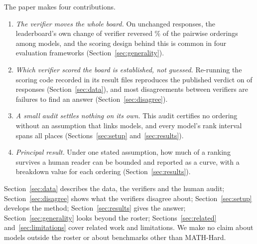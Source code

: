 The paper makes four contributions.
\begin{enumerate}
\item \emph{The verifier moves the whole board.} On unchanged responses, the leaderboard's own change
  of verifier reversed \BoardShiftDiscordantPct\% of the pairwise orderings among
  \BoardShiftModels{} models, and the scoring design behind this is common in four evaluation
  frameworks (Section~\ref{sec:generality}).
\item \emph{Which verifier scored the board is established, not guessed.} Re-running the scoring code
  recorded in its result files reproduces the published verdict on \EmReexecItems{} of
  \EmReexecItems{} responses (Section~\ref{sec:data}), and most disagreements between verifiers are
  failures to find an answer (Section~\ref{sec:disagree}).
\item \emph{A small audit settles nothing on its own.} This audit certifies no ordering
  without an assumption that links models, and every model's rank interval spans all \NumModels{}
  places (Sections~\ref{sec:setup} and~\ref{sec:results}).
\item \emph{Principal result.} Under one stated assumption, how much of a ranking survives a human
  reader can be bounded and reported as a curve, with a breakdown value for each ordering
  (Section~\ref{sec:results}).
\end{enumerate}

Section~\ref{sec:data} describes the data, the verifiers and the human audit;
Section~\ref{sec:disagree} shows what the verifiers disagree about; Section~\ref{sec:setup} develops
the method; Section~\ref{sec:results} gives the answer; Section~\ref{sec:generality} looks beyond the
roster; Sections~\ref{sec:related} and~\ref{sec:limitations} cover related work and limitations. We
make no claim about models outside the roster or about benchmarks other than MATH-Hard.
